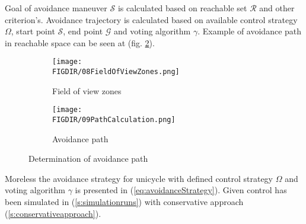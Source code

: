 Goal of avoidance maneuver $\mathscr{S}$ is calculated based on reachable set $\mathscr{R}$ and other criterion's. Avoidance trajectory is calculated based on available control strategy $\Omega$, start point $\mathscr{S}$, end point $\mathscr{G}$ and voting algorithm $\gamma$. Example of avoidance path in reachable space can be seen at (fig. \ref{fig:PathCalculation}).

\begin{figure}[H]
 
    \begin{subfigure}{0.5\textwidth}
    \texttt{[image: \\FIGDIR/08FieldOfViewZones.png]} 
    \caption{Field of view zones}
    \label{fig:FieldOfViewZones}
    \end{subfigure}
    \begin{subfigure}{0.5\textwidth}
    \texttt{[image: \\FIGDIR/09PathCalculation.png]}
    \caption{Avoidance path}
    \label{fig:PathCalculation}
    \end{subfigure}
    
\caption{Determination of avoidance path}
\label{fig:Avoidance}
\end{figure}

Moreless the avoidance strategy for unicycle with defined control strategy $\Omega$ and voting algorithm $\gamma$ is presented in (\ref{eq:avoidanceStrategy}). Given control has been simulated in (\ref{s:simulationruns}) with conservative approach (\ref{s:conservativeapproach}).
